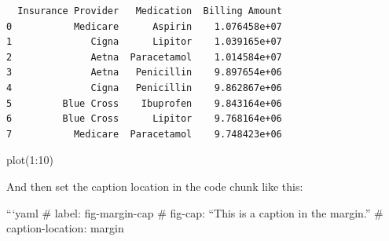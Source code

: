 \documentclass[
  letterpaper,
  DIV=11,
  numbers=noendperiod]{scrartcl}
\begin{document}
\begin{verbatim}
  Insurance Provider   Medication  Billing Amount
0           Medicare      Aspirin    1.076458e+07
1              Cigna      Lipitor    1.039165e+07
2              Aetna  Paracetamol    1.014584e+07
3              Aetna   Penicillin    9.897654e+06
4              Cigna   Penicillin    9.862867e+06
5         Blue Cross    Ibuprofen    9.843164e+06
6         Blue Cross      Lipitor    9.768164e+06
7           Medicare  Paracetamol    9.748423e+06
\end{verbatim}

plot(1:10)

And then set the caption location in the code chunk like this:

```yaml \#\textbar{} label: fig-margin-cap \#\textbar{} fig-cap: ``This
is a caption in the margin.'' \#\textbar{} caption-location: margin
\end{document}
